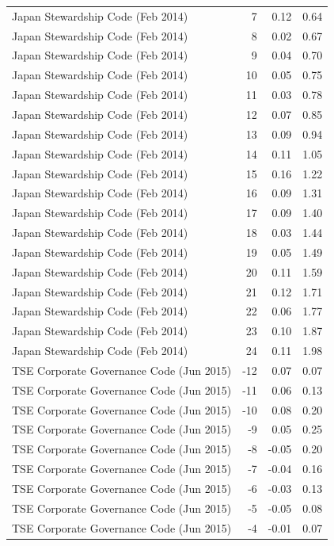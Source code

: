 \begin{table}
\begin{tabular}{lrrr}
Japan Stewardship Code (Feb 2014) & 7 & 0.12 & 0.64 \\
Japan Stewardship Code (Feb 2014) & 8 & 0.02 & 0.67 \\
Japan Stewardship Code (Feb 2014) & 9 & 0.04 & 0.70 \\
Japan Stewardship Code (Feb 2014) & 10 & 0.05 & 0.75 \\
Japan Stewardship Code (Feb 2014) & 11 & 0.03 & 0.78 \\
Japan Stewardship Code (Feb 2014) & 12 & 0.07 & 0.85 \\
Japan Stewardship Code (Feb 2014) & 13 & 0.09 & 0.94 \\
Japan Stewardship Code (Feb 2014) & 14 & 0.11 & 1.05 \\
Japan Stewardship Code (Feb 2014) & 15 & 0.16 & 1.22 \\
Japan Stewardship Code (Feb 2014) & 16 & 0.09 & 1.31 \\
Japan Stewardship Code (Feb 2014) & 17 & 0.09 & 1.40 \\
Japan Stewardship Code (Feb 2014) & 18 & 0.03 & 1.44 \\
Japan Stewardship Code (Feb 2014) & 19 & 0.05 & 1.49 \\
Japan Stewardship Code (Feb 2014) & 20 & 0.11 & 1.59 \\
Japan Stewardship Code (Feb 2014) & 21 & 0.12 & 1.71 \\
Japan Stewardship Code (Feb 2014) & 22 & 0.06 & 1.77 \\
Japan Stewardship Code (Feb 2014) & 23 & 0.10 & 1.87 \\
Japan Stewardship Code (Feb 2014) & 24 & 0.11 & 1.98 \\
TSE Corporate Governance Code (Jun 2015) & -12 & 0.07 & 0.07 \\
TSE Corporate Governance Code (Jun 2015) & -11 & 0.06 & 0.13 \\
TSE Corporate Governance Code (Jun 2015) & -10 & 0.08 & 0.20 \\
TSE Corporate Governance Code (Jun 2015) & -9 & 0.05 & 0.25 \\
TSE Corporate Governance Code (Jun 2015) & -8 & -0.05 & 0.20 \\
TSE Corporate Governance Code (Jun 2015) & -7 & -0.04 & 0.16 \\
TSE Corporate Governance Code (Jun 2015) & -6 & -0.03 & 0.13 \\
TSE Corporate Governance Code (Jun 2015) & -5 & -0.05 & 0.08 \\
TSE Corporate Governance Code (Jun 2015) & -4 & -0.01 & 0.07 \\

\end{tabular}
\end{table}
